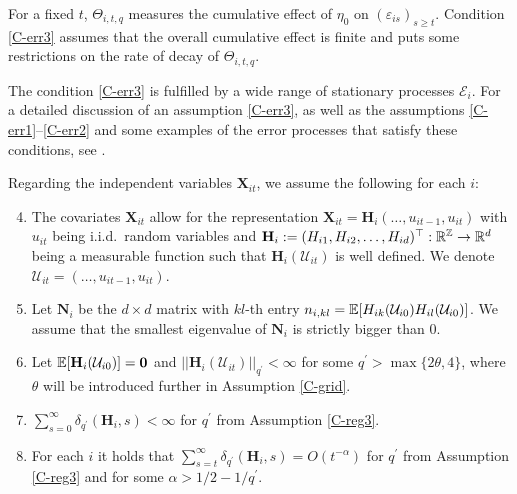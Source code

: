 \documentclass[a4paper,12pt]{article}
\begin{document}
For a fixed $t$, $\Theta_{i, t,q}$ measures the cumulative effect of $\eta_0$ on $(\varepsilon_{is})_{s\geq t}$. Condition \ref{C-err3} assumes that the overall cumulative effect is finite and puts some restrictions on the rate of decay of $\Theta_{i, t,q}$.

The condition \ref{C-err3} is fulfilled by a wide range of stationary processes $\mathcal{E}_i$. For a detailed discussion of an assumption \ref{C-err3}, as well as the assumptions \ref{C-err1}--\ref{C-err2} and some examples of the error processes that satisfy these conditions, see \linebreak \cite{KhismatullinaVogt2020}.

Regarding the independent variables $ \mathbf{X}_{it}$, we assume the following for each $i$:

\begin{enumerate}[label=(C\arabic*),leftmargin=1.05cm]
\setcounter{enumi}{3}

\item \label{C-reg1} The covariates $ \mathbf{X}_{it}$ allow for the representation $ \mathbf{X}_{it} = \mathbf{H}_i(\ldots,u_{it-1},u_{it})$ with $u_{it}$ being i.i.d.\ random variables and $\mathbf{H}_i := (H_{i1}, H_{i2}, \ldots, H_{id})^\top: \mathbb{R}^{\mathbb{Z}} \rightarrow \mathbb{R}^d$ being a measurable function such that $\mathbf{H}_i(\mathcal{U}_{it})$ is well defined. We denote \linebreak $\mathcal{U}_{it} = (\ldots, u_{it-1}, u_{it})$.

\item \label{C-reg2} Let $\mathbf{N}_i$ be the $d\times d$ matrix with $kl$-th entry $n_{i, kl}= \mathbb{E}[H_{ik}(\mathcal{U}_{i0})H_{il}(\mathcal{U}_{i0})]$. We assume that the smallest eigenvalue of $\mathbf{N}_i$ is strictly bigger than $0$.

\item \label{C-reg3} Let $\mathbb{E} [\mathbf{H}_{i}(\mathcal{U}_{i0})]=\mathbf{0}$ and $||\mathbf{H}_{i}(\mathcal{U}_{it})||_{q^\prime} <\infty$ for some $q^\prime > \max\{ 2\theta, 4\}$, where $\theta$ will be introduced further in Assumption \ref{C-grid}.
\item \label{C-reg4} $\sum_{s=0}^\infty \delta_{q^\prime}(\mathbf{H}_i, s)<\infty$ for $q^\prime$ from Assumption \ref{C-reg3}.
\item \label{C-reg5} For each $i$ it holds that $\sum_{s=t}^{\infty} \delta_{q^\prime}(\mathbf{H}_{i}, s)= O(t^{-\alpha}) $ for $q^\prime$ from Assumption \ref{C-reg3} and for some $\alpha > 1/2 - 1/{q^\prime}$.
\end{enumerate}
\end{document}
